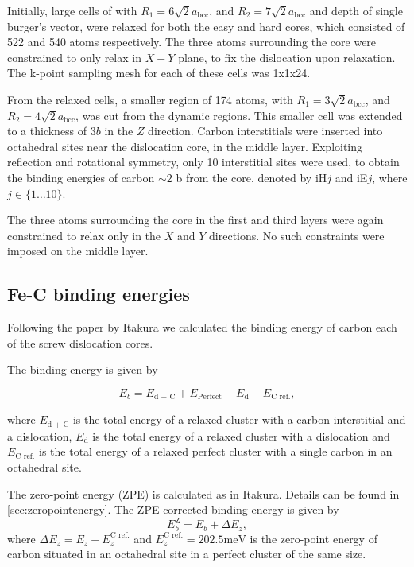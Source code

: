 \documentclass[a4paper,11pt]{article}
\begin{document}
Initially, large cells of with \(R_1 = 6\sqrt{2}a_{\text{bcc}}\), and \(R_2 =
   7\sqrt{2}a_{\text{bcc}}\) and depth of single burger's vector, were relaxed
for both the easy and hard cores, which consisted of 522 and 540 atoms
respectively. The three atoms surrounding the core were constrained to only
relax in \(X-Y\) plane, to fix the dislocation upon relaxation. 
The k-point sampling mesh for each of these cells was 1x1x24.

From the relaxed cells, a smaller region of 174 atoms, with \(R_1 = 3\sqrt{2}a_{\text{bcc}}\), and \(R_2
   = 4\sqrt{2}a_{\text{bcc}}\), was cut from the dynamic regions. This smaller cell was extended to a
thickness of 3\(b\) in the \(Z\) direction. Carbon interstitials were inserted into octahedral sites
near the dislocation core, in the middle layer. Exploiting reflection and rotational symmetry,
only 10 interstitial sites were used, to obtain the binding energies of carbon \(\sim2\) b from the
core, denoted by iH\(j\) and iE\(j\), where \(j \in \{1\dots10\}\).

The three atoms surrounding the core in the first and third layers were again
constrained to relax only in the \(X\) and \(Y\) directions. No such constraints
were imposed on the middle layer. 


\subsection{Fe-C binding energies}
\label{sec:org2432bf8}
Following the paper by Itakura
\cite{itakura13_effec_hydrog_atoms_screw_disloc} we calculated the
binding energy of carbon each of the screw dislocation cores. 

The binding energy is given by 

\begin{equation}  
E_b = E_{\text{d + C}} + E_{\text{Perfect}}- E_{\text{d}} - E_{\text{C ref.}},    
\end{equation}

where \(E_{\text{d + C}}\) is the total energy of a relaxed cluster with a
carbon interstitial and a dislocation, \(E_{\text{d}}\) is the total
energy of a relaxed cluster with a dislocation and \(E_{\text{C
    ref.}}\) is the total energy of a relaxed perfect cluster with a single carbon in
an octahedral site. 

The zero-point energy (ZPE) is calculated as in Itakura. Details can be found in \ref{sec:zeropointenergy}. 
The ZPE corrected binding energy is given by 
\[ E^{\text{Z}}_{b} = E_b + \Delta E_z,  \]
where \(\Delta E_z = E_z - E_{z}^{\text{C ref.}}\) and \(E_{z}^{\text{C ref.}} = 202.5 \text{meV}\) is the zero-point energy of carbon
situated in an octahedral site in a perfect cluster of the same size. 
\end{document}
